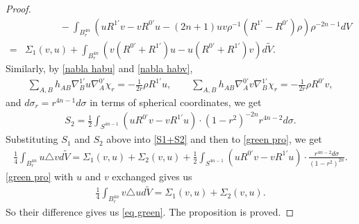 \documentclass[a4paper,11pt]{amsart}
\numberwithin{equation}{section}
\begin{document}
\begin{proof}
\begin{equation*}
\begin{aligned}
&\qquad\quad\;\;-\int_{B^{4n}_r}\left(uR^{1'}v-vR^{0'}u-(2n+1)uv\rho^{-1}(R^{1'}-R^{0'})\rho\right)\rho^{-2n-1}dV\\
=&\Sigma_1(v,u)+\int_{B^{4n}_r}\left(v\left(R^{0'}+R^{1'}\right)u-u\left(R^{0'}+R^{1'}\right)v\right)d\widetilde{V}.
\end{aligned}\end{equation*}
Similarly, by \eqref{nabla habu} and \eqref{nabla habv},
\begin{equation}\begin{aligned}
\sum_{A,B}h_{AB}\nabla_{B}^{1'}u\nabla_{A}^{0'} \chi_r=-\frac{1}{2r}\rho R^{1'}u,\qquad\sum_{A,B}h_{AB}\nabla_{A}^{0'}v\nabla_{B}^{1'} \chi_r=-\frac{1}{2r}\rho R^{0'}v,
\end{aligned}\end{equation}
and $d\sigma_r=r^{4n-1}d\sigma$ in terms of spherical coordinates, we get
\begin{equation*}\begin{aligned}
S_2=\frac12\int_{S^{4n-1}}(uR^{0'}v-vR^{1'}u )\cdot(1-r^2)^{-2n}r^{4n-2}d\sigma.
\end{aligned}\end{equation*}
Substituting $S_1$ and $S_2$ above into \eqref{S1+S2} and then to \eqref{green pro}, we get
\begin{equation}\begin{aligned}
\frac14\int_{B^{4n}_r}u\triangle vd\widetilde{V}=\Sigma_1(v,u)+\Sigma_2(v,u)+\frac12\int_{S^{4n-1}}(uR^{0'}v-vR^{1'}u )\cdot\frac{r^{4n-2}d\sigma}{(1-r^2)^{2n}}.
\end{aligned}\end{equation}
\eqref{green pro} with $u$ and $v$ exchanged gives us
\begin{equation}\begin{aligned}
\frac14\int_{B^{4n}_r}v\triangle ud\widetilde{V}=\Sigma_1(v,u)+\Sigma_2(v,u).
\end{aligned}\end{equation}
So their difference gives us \eqref{eq green}. The proposition is proved.
\end{proof}
\end{document}
